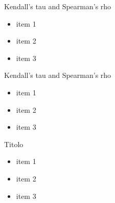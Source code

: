 \documentclass[11pt]{beamer}
\theoremstyle{plain}
\theoremstyle{definition}
\theoremstyle{remark}
\begin{document}
%
\begin{frame}{Kendall's tau and Spearman's rho}
   \begin{itemize}
      \item   				  						  
		item 1 
	  \item item 2
\item item 3
   \end{itemize}
\end{frame}

%
\begin{frame}{Kendall's tau and Spearman's rho}
   \begin{itemize}
      \item   				  						  
		item 1 
	  \item item 2
\item item 3
   \end{itemize}
\end{frame}

%
\begin{frame}{Titolo}
   \begin{itemize}
      \item   				  						  
		item 1 
	  \item item 2
\item item 3
   \end{itemize}
\end{frame}



%

\end{document}

